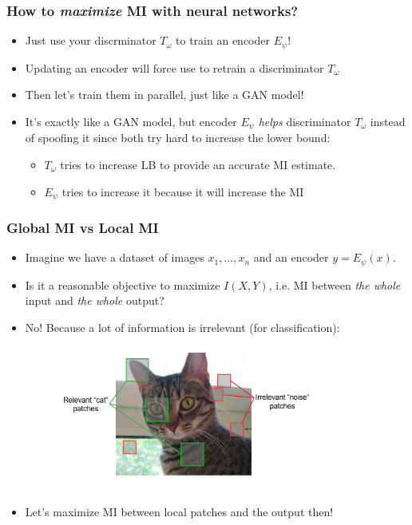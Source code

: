 \documentclass[10pt]{beamer}
\begin{document}
\begin{frame}
\frametitle{How to \textit{maximize} MI with neural networks?}

\begin{itemize}
    \item\pause Just use your discrminator $T_\omega$ to train an encoder $E_\psi$!
    \item\pause Updating an encoder will force use to retrain a discriminator $T_\omega$
    \item\pause Then let's train them in parallel, just like a GAN model!
    \item\pause It's exactly like a GAN model, but encoder $E_\psi$ \textit{helps} discriminator $T_\omega$ instead of spoofing it since both try hard to increase the lower bound:
    \begin{itemize}
        \item\pause $T_\omega$ tries to increase LB to provide an accurate MI estimate.
        \item\pause $E_\psi$ tries to increase it because it will increase the MI
    \end{itemize}
\end{itemize}
\end{frame}

\begin{frame}
\frametitle{Global MI vs Local MI}

\begin{itemize}
    \item\pause Imagine we have a dataset of images $x_1, ..., x_n$ and an encoder $y = E_\psi(x)$.
    \item\pause Is it a reasonable objective to maximize $I(X, Y)$, i.e. MI between \textit{the whole} input and \textit{the whole} output?
    \item\pause No! Because a lot of information is irrelevant (for classification):
    \begin{figure}
        \centering
        \pause\includegraphics[width=0.8\textwidth]{images/cat-local-vs-global.png}
    \end{figure}
    \item\pause Let's maximize MI between local patches and the output then!
\end{itemize}

\end{frame}
\end{document}
